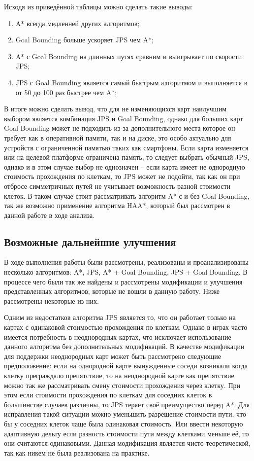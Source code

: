 Исходя из приведённой таблицы можно сделать такие выводы:

\begin{enumerate}
	\item A* всегда медленней других алгоритмов;
	\item Goal Bounding больше ускоряет JPS чем A*;
	\item A* с Goal Bounding на длинных путях сравним и выигрывает по скорости JPS;
	\item JPS с Goal Bounding является самый быстрым алгоритмом и выполняется в от 50 до 100 раз быстрее чем A*; 
\end{enumerate}

В итоге можно сделать вывод, что для не изменяющихся карт наилучшим выбором является комбинация JPS и Goal Bounding, однако для больших карт Goal Bounding может не подходить из-за дополнительного места которое он требует как в оперативной памяти, так и на диске, это особо актуально для устройств с ограниченной памятью таких как смартфоны. Если карта изменяется или на целевой платформе ограничена память, то следует выбрать обычный JPS, однако и в этом случае выбор не однозначен -- если карта имеет не однородную стоимость прохождения по клеткам, то JPS может не подойти, так как он при отбросе симметричных путей не учитывает возможность разной стоимости клеток. В таком случае стоит рассматривать алгоритм A* с и без Goal Bounding, так же возможно применение алгоритма HAA*, который был рассмотрен в данной работе в ходе анализа.  


\subsection{Возможные дальнейшие улучшения}

В ходе выполнения работы были рассмотрены, реализованы и проанализированы несколько алгоритмов: A*, JPS, A* + Goal Bounding, JPS + Goal Bounding. В процессе чего были так же найдены и рассмотрены модификации и улучшения представленных алгоритмов, которые не вошли в данную работу. Ниже рассмотрены некоторые из них.

Одним из недостатков алгоритма JPS является то, что он работает только на картах с одинаковой стоимостью прохождения по клеткам. Однако в играх часто имеется потребность в неоднородных картах, что исключает использование данного алгоритма без дополнительных модификаций. В качестве модификации для поддержки неоднородных карт может быть рассмотрено следующие предположение: если на однородной карте вынужденные соседи возникали когда клетку преграждало препятствие, то на неоднородной карте как препятствие можно так же рассматривать смену стоимости прохождения через клетку. При этом если стоимости прохождения по клеткам для соседних клеток в большинстве случаев различны, то JPS теряет своё преимущество перед A*. Для исправления такой ситуации можно уменьшить разрешение стоимости пути, что бы у соседних клеток чаще была одинаковая стоимость. Или ввести некоторую адаптивную дельту если разность стоимости пути между клетками меньше её, то они считаются одинаковыми. Данная модификация является чисто теоретической, так как никем не была реализована на практике.

